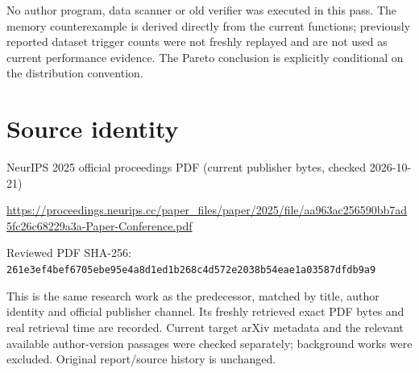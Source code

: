 \documentclass[11pt]{article}
\begin{document}
No author program, data scanner or old verifier was executed in this pass. The memory counterexample is derived directly from the current functions; previously reported dataset trigger counts were not freshly replayed and are not used as current performance evidence. The Pareto conclusion is explicitly conditional on the distribution convention.\par

\section*{Source identity}

NeurIPS 2025 official proceedings PDF (current publisher bytes, checked 2026-10-21)

\url{https://proceedings.neurips.cc/paper_files/paper/2025/file/aa963ac256590bb7ad5fc26c68229a3a-Paper-Conference.pdf}

Reviewed PDF SHA-256: \nolinkurl{261e3ef4bef6705ebe95e4a8d1ed1b268c4d572e2038b54eae1a03587dfdb9a9}

This is the same research work as the predecessor, matched by title, author identity and official publisher channel. Its freshly retrieved exact PDF bytes and real retrieval time are recorded. Current target arXiv metadata and the relevant available author-version passages were checked separately; background works were excluded. Original report/source history is unchanged.
\end{document}
